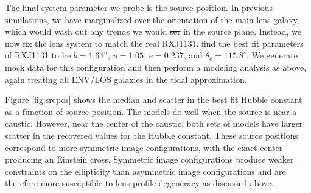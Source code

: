 \documentclass{emulateapj}
\providecommand{\DIFaddtex}[1]{{\protect\color{blue}\uwave{#1}}} %
\providecommand{\DIFdeltex}[1]{{\protect\color{red}\sout{#1}}}                      %
\providecommand{\DIFaddbegin}{} %
\providecommand{\DIFaddend}{} %
\providecommand{\DIFdelbegin}{} %
\providecommand{\DIFdelend}{} %
\providecommand{\DIFadd}[1]{\texorpdfstring{\DIFaddtex{#1}}{#1}} %
\providecommand{\DIFdel}[1]{\texorpdfstring{\DIFdeltex{#1}}{}} %
\begin{document}
The final system parameter we probe is the source position. In previous simulations, we have marginalized over the orientation of the main lens galaxy, which would wash out any trends we would \DIFdelbegin \DIFdel{ser }\DIFdelend \DIFaddbegin \DIFadd{see }\DIFaddend in the source plane. Instead, we now fix the lens system to match the real RXJ1131. \citet{Suyu13} find the best fit parameters of RXJ1131 to be $b = 1.64$'', $\eta = 1.05$, $e = 0.237$, and $\theta_e = 115.8^{\circ}$. We generate mock data for this configuration and then perform a modeling analysis as above, again treating all ENV/LOS galaxies in the tidal approximation.

Figure \ref{fig:srcpos} shows the median and scatter in the best fit Hubble constant as a function of source position. The models do well when the source is near a caustic. However, near the center of the caustic, both sets of models have larger scatter in the recovered values for the Hubble constant. These source positions correspond to more symmetric image configurations, with the exact center producing an Einstein cross. Symmetric image configurations produce weaker constraints on the ellipticity than asymmetric image configurations and are therefore more susceptible to lens profile degeneracy as discussed above.
\end{document}
